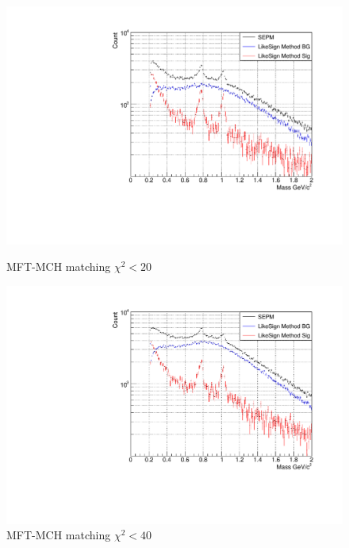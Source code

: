             \begin{figure}[htbp]
                \centering
                \begin{minipage}{0.45\textwidth}
                    \centering
                    \includegraphics[width=\textwidth]{fig/3_4_4_chi2_20.pdf}
                    \captionsetup{labelformat=empty}
                    \caption{MFT-MCH matching $\chi^2 < 20$}
                    \label{fig:chi2_20}
                \end{minipage}
                \hfill
                \begin{minipage}{0.45\textwidth}
                    \centering
                    \includegraphics[width=\textwidth]{fig/3_4_4_chi2_40.pdf}
                    \captionsetup{labelformat=empty}
                    \caption{MFT-MCH matching $\chi^2 < 40$}

\end{minipage}
\end{figure}
